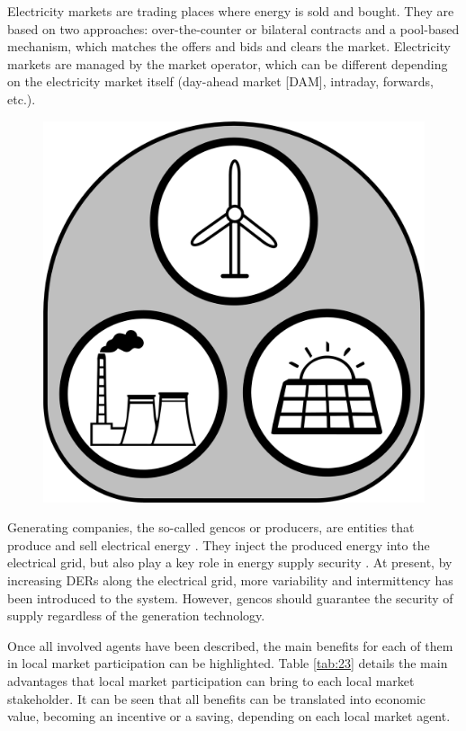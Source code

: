 Electricity markets are trading places where energy is sold and bought. They are based on two approaches: over-the-counter or bilateral contracts and a pool-based mechanism, which matches the offers and bids and clears the market. Electricity markets are managed by the market operator, which can be different depending on the electricity market itself (day-ahead market [DAM], intraday, forwards, etc.).\\


\begin{figure}
	\centering
	\includegraphics[width=0.1\columnwidth ]{ChapterIntro/Figures/Gencos.jpg}
	\label{gencos}  
\end{figure}


Generating companies, the so-called gencos or producers, are entities that produce and sell electrical energy \cite{Kirschen2004}. They inject the produced energy into the electrical grid, but also play a key role in energy supply security \cite{USEFFoundation2015a}. At present, by increasing DERs along the electrical grid, more variability and intermittency has been introduced to the system. However, gencos should guarantee the security of supply regardless of the generation technology.

Once all involved agents have been described, the main benefits for each of them in local market participation can be highlighted.
Table \ref{tab:23} details the main advantages that local market participation can bring to each local market stakeholder. It can be seen that all benefits can be translated into economic value, becoming an incentive or a saving, depending on each local market agent.

